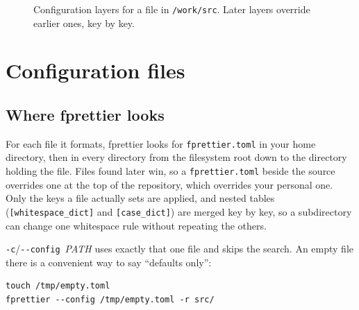 \documentclass[11pt,a4paper,openany]{book}
\newcommand{\code}[1]{\texttt{\small #1}}
\newcommand{\file}[1]{\texttt{\small\color{accent}#1}}
\newcommand{\flag}[1]{\texttt{\small -{}-#1}}
\begin{document}
\begin{figure}[ht]
\centering
{}
\caption{Configuration layers for a file in \file{/work/src}. Later layers
override earlier ones, key by key.}
\label{fig:config-layers}
\end{figure}

\section{Configuration files}

\subsection{Where fprettier looks}

For each file it formats, fprettier looks for \file{fprettier.toml} in your
home directory, then in every directory from the filesystem root down to the
directory holding the file. Files found later win, so a \file{fprettier.toml}
beside the source overrides one at the top of the repository, which overrides
your personal one. Only the keys a file actually sets are applied, and nested
tables (\code{[whitespace\_dict]} and \code{[case\_dict]}) are merged key by
key, so a subdirectory can change one whitespace rule without repeating the
others.

\code{-c}/\flag{config}~\textit{PATH} uses exactly that one file and skips the
search. An empty file there is a convenient way to say ``defaults only'':

\begin{lstlisting}[style=shell]
touch /tmp/empty.toml
fprettier --config /tmp/empty.toml -r src/
\end{lstlisting}
\end{document}
